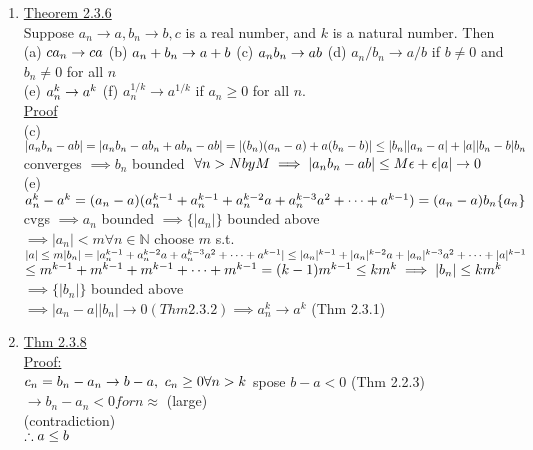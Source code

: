 \documentclass[12pt]{amsart}
\begin{document}
\begin{enumerate}
\item \underline{Theorem 2.3.6}\\
Suppose $a_n \rightarrow a, b_n \rightarrow b, c$ is a real number, and $k$ is a natural number. Then\\
(a) $c a_n \rightarrow ca\\$
(b) $a_n + b_n \rightarrow a+b\\$
(c) $a_n b_n \rightarrow ab\\$
(d) $a_n/b_n \rightarrow a/b$ if $b \neq 0$ and $b_n \neq 0$ for all $n$\\
(e) $a^k_n \rightarrow a^k\\$
(f) $a_n^{1/k} \rightarrow a^{1/k}$ if $a_n \geq 0$ for all $n$.\\
\underline{Proof}\\
(c) $|a_n b_n - ab| = | a_n b_n - a b_n + a b_n - a b |\\
= |(b_n) (a_n - a) + a(b_n - b) | \leq |b_n | | a_n - a | + | a | | b_n - b|\\
b_n$ converges $\implies b_n$ bounded $\,\, \forall n > N by M\\
\implies |a_n b_n - a b | \leq M \epsilon + \epsilon |a| \rightarrow 0$\\
(e) $a^k_n - a^k = (a_n - a ) (a_n^{k-1} + a_n^{k-1} + a_n^{k-2} a + a_n^{k-3} a^2 + \dots + a^{k-1})\\
= (a_n-a) b_n\\
\{ a_n \}$ cvgs $\implies a_n$ bounded $\implies \{ |a_n | \}$ bounded above\\
$\implies | a_n | < m \forall n \in \mathbb{N}$ choose $m$ s.t. $|a| \leq m\\
|b_n| = | a_n^{k-1} + a_n^{k-2} a + a_n^{k-3} a^2 + \dots + a^{k-1}| \leq |a_n|^{k-1} + |a_n|^{k-2} a + |a_n|^{k-3} a^2 + \dots + |a|^{k-1}\\$
$\leq m^{k-1} + m^{k-1} + m^{k-1} + \dots + m^{k-1} = (k-1) m^{k-1} \leq k m^k
\implies |b_n | \leq k m^k \\$
$\implies \{ | b_n | \}$ bounded above\\
$\implies |a_n - a | | b_n | \rightarrow 0 (Thm 2.3.2) \implies a_n^k \rightarrow a^k$ (Thm 2.3.1)\\


\hdashrule[0.5ex][c]{\linewidth}{0.5pt}{1.5mm}


\item \underline{Thm 2.3.8}\\
\underline{Proof:}\\
$c_n = b_n - a_n \rightarrow b-a,\,\, c_n \geq 0 \forall n > k\\$
spose $b-a < 0$ (Thm 2.2.3) $\rightarrow b_n-a_n < 0 for n \approx$ (large)\\
(contradiction)\\
$\therefore a \leq b\\$



\end{enumerate}
\end{document}
